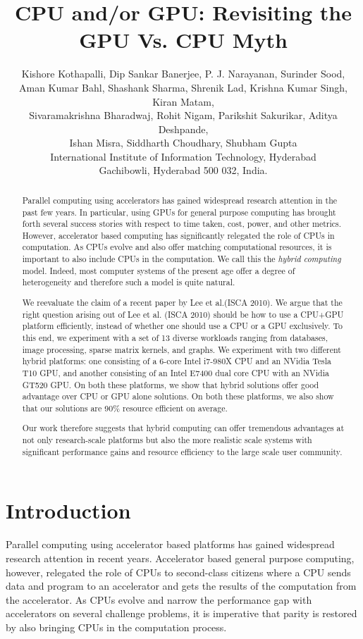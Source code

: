 \documentclass[11pt]{article}
\title{CPU and/or GPU: Revisiting the GPU Vs. CPU Myth}
\author{Kishore Kothapalli, Dip Sankar Banerjee, P. J. Narayanan,
Surinder Sood,\\ Aman Kumar Bahl, Shashank Sharma, Shrenik Lad, Krishna
Kumar Singh, Kiran Matam,\\ Sivaramakrishna Bharadwaj, Rohit Nigam,
Parikshit Sakurikar, Aditya Deshpande,\\ Ishan Misra, Siddharth Choudhary, Shubham Gupta\\
International Institute of Information Technology, Hyderabad \\
Gachibowli, Hyderabad 500 032, India. 
}
\date{}
\begin{document}
\maketitle

\begin{abstract}
Parallel computing using accelerators has gained widespread research
attention in the past few years. In particular, using GPUs for general
purpose computing has brought forth several success stories with respect
to time taken, cost, power, and other metrics. However, accelerator
based computing has significantly relegated the role of CPUs in
computation. As CPUs evolve and also offer matching computational
resources, it is important to also include CPUs in the computation. We
call this the {\em hybrid computing} model. Indeed, most computer
systems of the present age offer a degree of heterogeneity and therefore
such a model is quite natural.

We reevaluate the claim of a recent paper by Lee et al.(ISCA 2010). We
argue that the right question arising out of Lee et al. (ISCA 2010)
should be how to use a CPU+GPU platform efficiently, instead of whether
one should use a CPU or a GPU exclusively. To this end, we 
experiment with a set of 13 diverse workloads
ranging from databases, image processing, sparse matrix kernels, and graphs.
We experiment with two different hybrid platforms: one consisting of a
6-core Intel i7-980X CPU and an NVidia Tesla T10 GPU, and another consisting
of an Intel E7400 dual core CPU with an NVidia GT520 GPU. On both these
platforms, we show that hybrid solutions offer good advantage over CPU or GPU alone
solutions.  On both these platforms, we also show that our solutions are
90\% resource efficient on average. 

Our work therefore suggests that hybrid computing can offer tremendous
advantages at not only research-scale platforms but also the more realistic
scale  systems with significant performance gains and resource efficiency to the 
large scale user community. 

\end{abstract}

\section{Introduction}
\label{sec:intro}
Parallel computing using accelerator based platforms has  
gained widespread research attention in recent years. 
Accelerator based general
purpose computing, however, relegated the role of CPUs to second-class
citizens where a CPU sends data and program to an accelerator and
gets the results of the computation from the accelerator. As CPUs
evolve and narrow the performance gap with accelerators on
several challenge problems, it is imperative that parity is restored
by also bringing CPUs in the computation process. 
\end{document}

